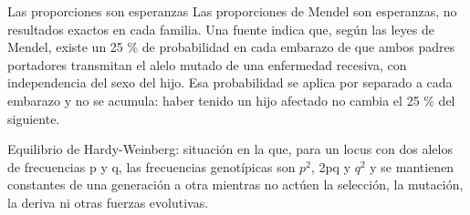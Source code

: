 \documentclass{book}
\begin{document}
\begin{tcolorbox}[title={Definición}, studiumdef, breakable]

Las proporciones son esperanzas
Las proporciones de Mendel son esperanzas, no resultados exactos en cada familia. Una fuente indica que, según las leyes de Mendel, existe un 25 \% de probabilidad en cada embarazo de que ambos padres portadores transmitan el alelo mutado de una enfermedad recesiva, con independencia del sexo del hijo. Esa probabilidad se aplica por separado a cada embarazo y no se acumula: haber tenido un hijo afectado no cambia el 25 \% del siguiente.

\end{tcolorbox}

\begin{tcolorbox}[title={Definición}, studiumdef, breakable]

Equilibrio de Hardy-Weinberg: situación en la que, para un locus con dos alelos de frecuencias p y q, las frecuencias genotípicas son \(p^{2}\), 2pq y \(q^{2}\) y se mantienen constantes de una generación a otra mientras no actúen la selección, la mutación, la deriva ni otras fuerzas evolutivas.

\end{tcolorbox}
\end{document}
